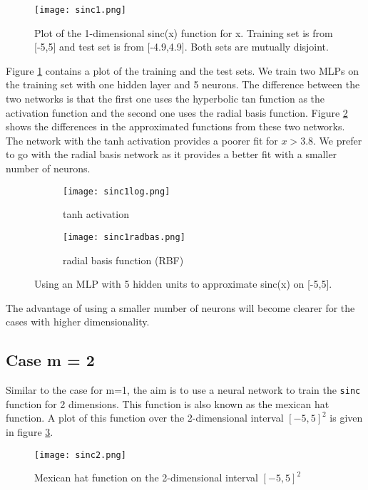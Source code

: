 \documentclass[paper=a4, fontsize=11pt]{scrartcl} %
\numberwithin{equation}{section} %
\begin{document}
\begin{figure}[ht]
\centering
\texttt{[image: sinc1.png]}
\caption{Plot of the 1-dimensional sinc(x) function for x. Training set is from [-5,5] and test set is from [-4.9,4.9]. Both sets are mutually disjoint.}
\label{sinc1}
\end{figure}

Figure \ref{sinc1} contains a plot of the training and the test sets. We train two MLPs on the training set with one hidden layer and 5 neurons. The difference between the two networks is that the first one uses the hyperbolic tan function as the activation function and the second one uses the radial basis function. Figure \ref{sinc1fit} shows the differences in the approximated functions from these two networks. The network with the tanh activation provides a poorer fit for $x>3.8$. We prefer to go with the radial basis network as it provides a better fit with a smaller number of neurons.

\begin{figure}[ht]
	\begin{subfigure}[b]{0.5\textwidth}
		\centering
		\texttt{[image: sinc1log.png]}
		\caption{tanh activation}
	\end{subfigure}
	\begin{subfigure}[b]{0.5\textwidth}
		\centering
		\texttt{[image: sinc1radbas.png]}
		\caption{radial basis function (RBF)}
	\end{subfigure}
	\caption{Using an MLP with 5 hidden units to approximate sinc(x) on [-5,5].}
	\label{sinc1fit}
\end{figure}

The advantage of using a smaller number of neurons will become clearer for the cases with higher dimensionality.

\subsection*{Case m = 2}
Similar to the case for m=1, the aim is to use a neural network to train the \texttt{sinc} function for 2 dimensions. This function is also known as the mexican hat function. A plot of this function over the 2-dimensional interval $[-5,5]^2$ is given in figure \ref{sinc2}.

\begin{figure}[h]
\centering
\texttt{[image: sinc2.png]}
\caption{Mexican hat function on the 2-dimensional interval $[-5,5]^2$}
\label{sinc2}
\end{figure}
\end{document}
